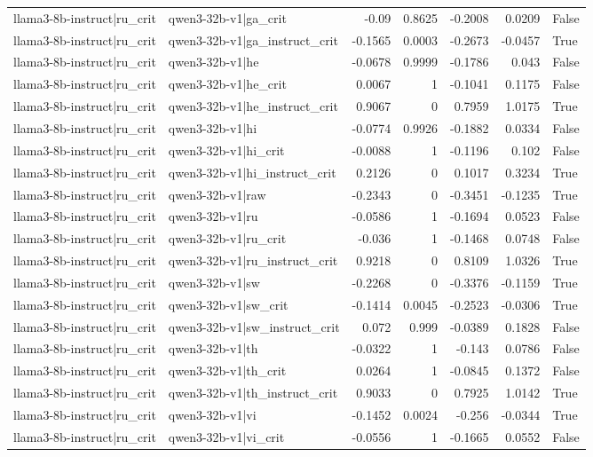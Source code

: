 \begin{table}
\begin{tabular}{l l r r r r l}
llama3-8b-instruct|ru_crit & qwen3-32b-v1|ga_crit & -0.09 & 0.8625 & -0.2008 & 0.0209 & False \\
llama3-8b-instruct|ru_crit & qwen3-32b-v1|ga_instruct_crit & -0.1565 & 0.0003 & -0.2673 & -0.0457 & True \\
llama3-8b-instruct|ru_crit & qwen3-32b-v1|he & -0.0678 & 0.9999 & -0.1786 & 0.043 & False \\
llama3-8b-instruct|ru_crit & qwen3-32b-v1|he_crit & 0.0067 & 1 & -0.1041 & 0.1175 & False \\
llama3-8b-instruct|ru_crit & qwen3-32b-v1|he_instruct_crit & 0.9067 & 0 & 0.7959 & 1.0175 & True \\
llama3-8b-instruct|ru_crit & qwen3-32b-v1|hi & -0.0774 & 0.9926 & -0.1882 & 0.0334 & False \\
llama3-8b-instruct|ru_crit & qwen3-32b-v1|hi_crit & -0.0088 & 1 & -0.1196 & 0.102 & False \\
llama3-8b-instruct|ru_crit & qwen3-32b-v1|hi_instruct_crit & 0.2126 & 0 & 0.1017 & 0.3234 & True \\
llama3-8b-instruct|ru_crit & qwen3-32b-v1|raw & -0.2343 & 0 & -0.3451 & -0.1235 & True \\
llama3-8b-instruct|ru_crit & qwen3-32b-v1|ru & -0.0586 & 1 & -0.1694 & 0.0523 & False \\
llama3-8b-instruct|ru_crit & qwen3-32b-v1|ru_crit & -0.036 & 1 & -0.1468 & 0.0748 & False \\
llama3-8b-instruct|ru_crit & qwen3-32b-v1|ru_instruct_crit & 0.9218 & 0 & 0.8109 & 1.0326 & True \\
llama3-8b-instruct|ru_crit & qwen3-32b-v1|sw & -0.2268 & 0 & -0.3376 & -0.1159 & True \\
llama3-8b-instruct|ru_crit & qwen3-32b-v1|sw_crit & -0.1414 & 0.0045 & -0.2523 & -0.0306 & True \\
llama3-8b-instruct|ru_crit & qwen3-32b-v1|sw_instruct_crit & 0.072 & 0.999 & -0.0389 & 0.1828 & False \\
llama3-8b-instruct|ru_crit & qwen3-32b-v1|th & -0.0322 & 1 & -0.143 & 0.0786 & False \\
llama3-8b-instruct|ru_crit & qwen3-32b-v1|th_crit & 0.0264 & 1 & -0.0845 & 0.1372 & False \\
llama3-8b-instruct|ru_crit & qwen3-32b-v1|th_instruct_crit & 0.9033 & 0 & 0.7925 & 1.0142 & True \\
llama3-8b-instruct|ru_crit & qwen3-32b-v1|vi & -0.1452 & 0.0024 & -0.256 & -0.0344 & True \\
llama3-8b-instruct|ru_crit & qwen3-32b-v1|vi_crit & -0.0556 & 1 & -0.1665 & 0.0552 & False \\

\end{tabular}
\end{table}
